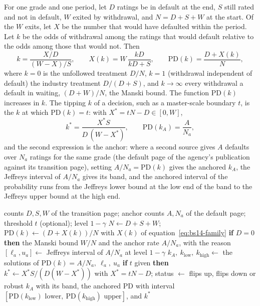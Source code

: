 For one grade and one period, let $D$ ratings be in default at the end, $S$ still rated and not in default, $W$ exited by withdrawal, and $N=D+S+W$ at the start. Of the $W$ exits, let $X$ be the number that would have defaulted within the period. Let $k$ be the odds of withdrawal among the ratings that would default relative to the odds among those that would not. Then
\begin{equation}
k=\frac{X/D}{(W-X)/S},\qquad X(k)=W\,\frac{kD}{kD+S},\qquad \mathrm{PD}(k)=\frac{D+X(k)}{N},
\label{eq:bs14-family}
\end{equation}
where $k=0$ is the unfollowed treatment $D/N$, $k=1$ (withdrawal independent of default) the industry treatment $D/(D+S)$, and $k\to\infty$ every withdrawal a default in waiting, $(D+W)/N$, the Manski bound. The function $\mathrm{PD}(k)$ increases in $k$. The tipping $k$ of a decision, such as a master-scale boundary $t$, is the $k$ at which $\mathrm{PD}(k)=t$: with $X^{*}=tN-D\in[0,W]$,
\begin{equation}
k^{*}=\frac{X^{*}S}{D\,(W-X^{*})},\qquad \mathrm{PD}(k_{A})=\frac{A}{N_{a}},
\label{eq:bs14-tipping}
\end{equation}
and the second expression is the anchor: where a second source gives $A$ defaults over $N_{a}$ ratings for the same grade (the default page of the agency's publication against its transition page), setting $A/N_a=\mathrm{PD}(k)$ gives the anchored $k_A$, the Jeffreys interval \citep{proposed:jeffreys1946,ratings:brown2001} of $A/N_a$ gives its band, and the anchored interval of the probability runs from the Jeffreys lower bound at the low end of the band to the Jeffreys upper bound at the high end.

\begin{algorithm}[htbp]
\caption{The anchored default probability of one grade.}
\label{alg:bs14}
\begin{algorithmic}[1]
\Require counts $D,S,W$ of the transition page; anchor counts $A,N_a$ of the default page; threshold $t$ (optional); level $1-\gamma$
\State $N\gets D+S+W$; \quad $\mathrm{PD}(k)\gets (D+X(k))/N$ with $X(k)$ of equation~\eqref{eq:bs14-family}
\State \textbf{if} $D=0$ \textbf{then} \Return the Manski bound $W/N$ and the anchor rate $A/N_a$, with the reason
\State $[\ell_a,u_a]\gets$ Jeffreys interval of $A/N_a$ at level $1-\gamma$
\State $k_A,\ k_{\mathrm{low}},\ k_{\mathrm{high}}\gets$ the solutions of $\mathrm{PD}(k)=A/N_a,\ \ell_a,\ u_a$
\State \textbf{if} $t$ given \textbf{then} $k^{*}\gets X^{*}S/(D(W-X^{*}))$ with $X^{*}=tN-D$; status $\gets$ flips up, flips down or robust
\State \Return $k_A$ with its band, the anchored $\mathrm{PD}$ with interval $[\mathrm{PD}(k_{\mathrm{low}})\text{ lower},\ \mathrm{PD}(k_{\mathrm{high}})\text{ upper}]$, and $k^{*}$
\end{algorithmic}
\end{algorithm}

